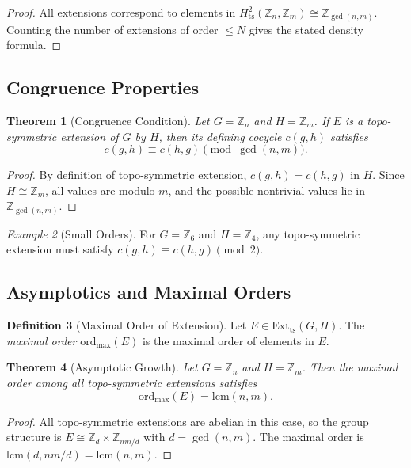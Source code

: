 \documentclass[11pt,a4paper]{article}
\theoremstyle{plain}
\newtheorem{theorem}{Theorem}[section]
\theoremstyle{definition}
\newtheorem{definition}[theorem]{Definition}
\theoremstyle{remark}
\newtheorem{example}[theorem]{Example}
\begin{document}
	\begin{proof}
		All extensions correspond to elements in $H^2_{\mathrm{ts}}(\mathbb{Z}_n,\mathbb{Z}_m) \cong \mathbb{Z}_{\gcd(n,m)}$.  
		Counting the number of extensions of order $\le N$ gives the stated density formula.
	\end{proof}
	
	\subsection{Congruence Properties}
	
	\begin{theorem}[Congruence Condition]
		Let $G = \mathbb{Z}_n$ and $H = \mathbb{Z}_m$.  
		If $E$ is a topo-symmetric extension of $G$ by $H$, then its defining cocycle $c(g,h)$ satisfies
		\[
		c(g,h) \equiv c(h,g) \pmod{\gcd(n,m)}.
		\]
	\end{theorem}
	
	\begin{proof}
		By definition of topo-symmetric extension, $c(g,h) = c(h,g)$ in $H$.  
		Since $H \cong \mathbb{Z}_m$, all values are modulo $m$, and the possible nontrivial values lie in $\mathbb{Z}_{\gcd(n,m)}$.
	\end{proof}
	
	\begin{example}[Small Orders]
		For $G = \mathbb{Z}_6$ and $H = \mathbb{Z}_4$, any topo-symmetric extension must satisfy $c(g,h) \equiv c(h,g) \pmod 2$.
	\end{example}
	
	\subsection{Asymptotics and Maximal Orders}
	
	\begin{definition}[Maximal Order of Extension]
		Let $E \in \mathrm{Ext}_{\mathrm{ts}}(G,H)$.  
		The \emph{maximal order} $\mathrm{ord}_{\max}(E)$ is the maximal order of elements in $E$.
	\end{definition}
	
	\begin{theorem}[Asymptotic Growth]
		Let $G = \mathbb{Z}_n$ and $H = \mathbb{Z}_m$.  
		Then the maximal order among all topo-symmetric extensions satisfies
		\[
		\mathrm{ord}_{\max}(E) = \mathrm{lcm}(n,m).
		\]
	\end{theorem}
	
	\begin{proof}
		All topo-symmetric extensions are abelian in this case, so the group structure is $E \cong \mathbb{Z}_d \times \mathbb{Z}_{nm/d}$ with $d = \gcd(n,m)$.  
		The maximal order is $\mathrm{lcm}(d, nm/d) = \mathrm{lcm}(n,m)$.
	\end{proof}
	
\end{document}
